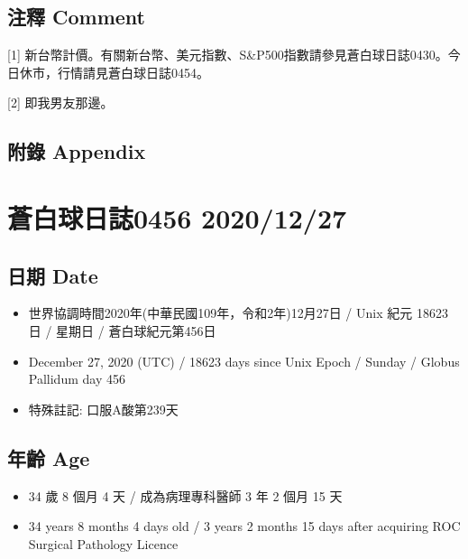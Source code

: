 \documentclass[
]{article}
\providecommand{\tightlist}{%
  \setlength{\itemsep}{0pt}\setlength{\parskip}{0pt}}
\begin{document}
\hypertarget{ux6ce8ux91cb-comment-25}{%
\subsection{注釋 Comment}\label{ux6ce8ux91cb-comment-25}}

{[}1{]}
新台幣計價。有關新台幣、美元指數、S\&P500指數請參見蒼白球日誌0430。今日休市，行情請見蒼白球日誌0454。

{[}2{]} 即我男友那邊。

\hypertarget{ux9644ux9304-appendix-25}{%
\subsection{附錄 Appendix}\label{ux9644ux9304-appendix-25}}

\hypertarget{ux84bcux767dux7403ux65e5ux8a8c0456-20201227}{%
\section{蒼白球日誌0456
2020/12/27}\label{ux84bcux767dux7403ux65e5ux8a8c0456-20201227}}

\hypertarget{ux65e5ux671f-date-26}{%
\subsection{日期 Date}\label{ux65e5ux671f-date-26}}

\begin{itemize}
\tightlist
\item
  世界協調時間2020年(中華民國109年，令和2年)12月27日 / Unix 紀元 18623
  日 / 星期日 / 蒼白球紀元第456日
\item
  December 27, 2020 (UTC) / 18623 days since Unix Epoch / Sunday /
  Globus Pallidum day 456
\item
  特殊註記: 口服A酸第239天
\end{itemize}

\hypertarget{ux5e74ux9f61-age-26}{%
\subsection{年齡 Age}\label{ux5e74ux9f61-age-26}}

\begin{itemize}
\tightlist
\item
  34 歲 8 個月 4 天 / 成為病理專科醫師 3 年 2 個月 15 天
\item
  34 years 8 months 4 days old / 3 years 2 months 15 days after
  acquiring ROC Surgical Pathology Licence
\end{itemize}
\end{document}
